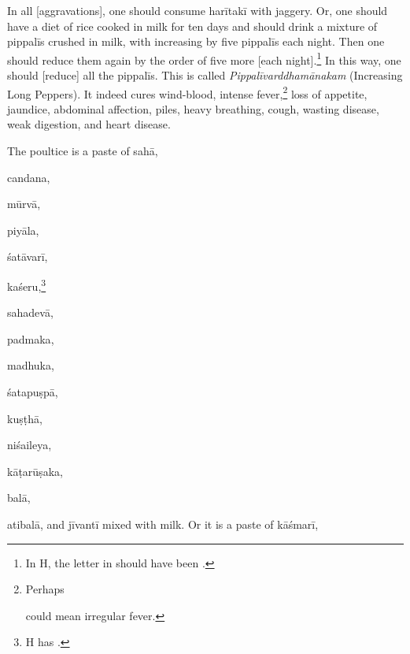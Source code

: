 \begin{translation}
\begin{tt}
        \item[12]
        In all
            [aggravations],
        one should
        consume
        \gls{harītakī}
        with
        jaggery. Or,
        one should
        have a diet
        of rice
        cooked in
        milk for ten
        days and
        should drink
        a mixture of
        \gls{pippalī}s
        crushed in
        milk, with
        increasing
        by five
        \gls{pippalī}s
        each night.
        Then one
        should
        reduce
        them again
        by the order
        of five more
            [each
                night].\footnote{In
            H, the
            letter 
            in
            should
            have been
            .} In
        this way,
        one should
            [reduce] all
        the
        \gls{pippalī}s.
        This is
        called
        \textit{Pippalīvarddhamānakam}
        (Increasing
        Long
        Peppers). It
        indeed
        cures wind-blood,
        intense
        fever,\footnote{Perhaps

            could mean
            irregular
            fever.} loss
        of appetite,
        jaundice,
        abdominal
        affection,
        piles, heavy
        breathing,
        cough,
        wasting
        disease,
        weak
        digestion,
        and heart
        disease.

        The
        poultice
        is a
        paste
        of \gls{sahā},

        \gls{candana},

        \gls{mūrvā},

        \gls{piyāla},

        \gls{śatāvarī},

        \gls{kaśeru},\footnote{H
            has
            .}

        \gls{sahadevā},

        \gls{padmaka},

        \gls{madhuka},

        \gls{śatapuṣpā},

        \gls{kuṣṭhā},

        \gls{niśaileya},

        \gls{kāṭarūṣaka},

        \gls{balā},

        \gls{atibalā},
        and
        \gls{jīvantī}
        mixed
        with
        milk.
        Or it is
        a paste
        of
        \gls{kāśmarī},


\end{tt}
\end{translation}
